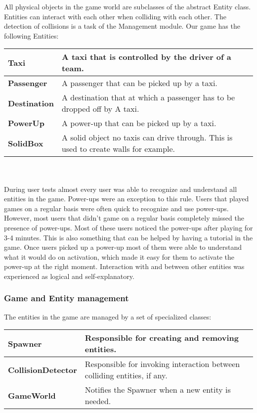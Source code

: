 {All physical objects in the game world are subclasses of the abstract Entity class. Entities can interact with each other when colliding with each other. The detection of collisions is a task of the Management module. Our game has the following Entities:\\

\begin{tabular}{| l | l |} 
\hline
\textbf{Taxi} & A taxi that is controlled by the driver of a team. \\ \hline
\textbf{Passenger} & A passenger that can be picked up by a taxi. \\ \hline
\textbf{Destination} & A destination that at which a passenger has to be dropped off by A taxi. \\ \hline 
\textbf{PowerUp} & A power-up that can be picked up by a taxi. \\ \hline
\textbf{SolidBox} & A solid object no taxis can drive through. This is used to create walls for example. \\ \hline
\end{tabular}\\ \\ 

During user tests almost every user was able to recognize and understand all entities  in the game. Power-ups were an exception to this rule. Users that played games on a regular basis were often quick to recognize and use power-ups. However, most users that didn't game on a regular basis  completely missed the presence of power-ups. Most of these users noticed the power-ups after playing for 3-4 minutes. This is also something that can be helped by having a tutorial in the game. Once users picked up a power-up most of them were able to understand what it would do on activation, which made it easy for them to activate the power-up at the right moment.  Interaction with and between other entities was experienced as logical and self-explanatory.


\subsubsection{Game and Entity management}

The entities in the game are managed by a set of specialized classes:\\

\begin{tabular}{| l | l |} 
\hline
\textbf{Spawner} & Responsible for creating and removing entities. \\ \hline
\textbf{CollisionDetector}& Responsible for invoking interaction between colliding entities, if any. \\ \hline
\textbf{GameWorld} & Notifies the Spawner when a new entity is needed. \\ \hline
\end{tabular}\\ \\

}

